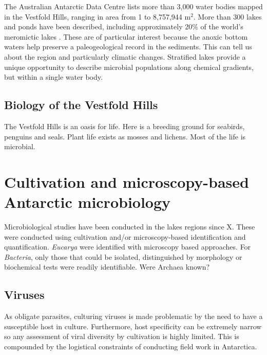 The Australian Antarctic Data Centre lists more than 3,000 water bodies mapped in the Vestfold Hills, ranging in area from 1 to 8,757,944 m$^2$. %
More than 300 lakes and ponds have been described, including approximately 20\% of the world's meromictic lakes \cite{Gibson1999}. %
These are of particular interest because the anoxic bottom waters help preserve a paleogeological record in the sediments.
This can tell us about the region and particularly climatic changes.
Stratified lakes provide a unique opportunity to describe microbial populations along chemical gradients, but within a single water body. 


\subsection{Biology of the Vestfold Hills}

The Vestfold Hills is an oasis for life.
Here is a breeding ground for seabirds, penguins and seals.
Plant life exists as mosses and lichens.
Most of the life is microbial.



\section{Cultivation and microscopy-based Antarctic microbiology}

Microbiological studies have been conducted in the lakes regions since X.
These were conducted using cultivation and/or microscopy-based identification and quantification. 
\emph{Eucarya} were identified with microscopy based approaches.
For \emph{Bacteria}, only those that could be isolated, distinguished by morphology or biochemical tests were readily identifiable.
Were Archaea known?

\subsection{Viruses}
As obligate parasites, culturing viruses is made problematic by the need to have a susceptible host in culture.
Furthermore, host specificity can be extremely narrow so any assessment of viral diversity by cultivation is highly limited.
This is compounded by the logistical constraints of conducting field work in Antarctica.

